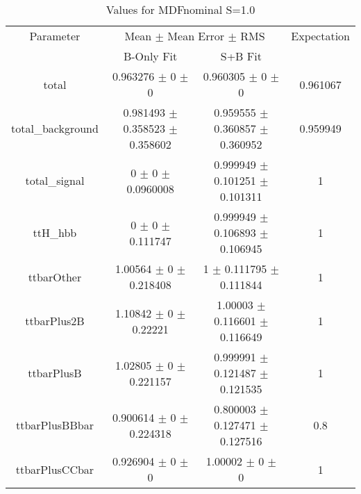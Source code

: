 \begin{table}
\centering
\caption{Values for MDFnominal S=1.0}
\begin{tabular}{cccc}
\toprule
Parameter & \multicolumn{2}{c}{Mean $\pm$ Mean Error $\pm$ RMS} & Expectation\\
 & B-Only Fit & S+B Fit & \\
\midrule
total & \num{0.963276} $\pm$ \num{0} $\pm$ \num{0} & \num{0.960305} $\pm$ \num{0} $\pm$ \num{0} & \num{0.961067}\\
total\_background & \num{0.981493} $\pm$ \num{0.358523} $\pm$ \num{0.358602} & \num{0.959555} $\pm$ \num{0.360857} $\pm$ \num{0.360952} & \num{0.959949}\\
total\_signal & \num{0} $\pm$ \num{0} $\pm$ \num{0.0960008} & \num{0.999949} $\pm$ \num{0.101251} $\pm$ \num{0.101311} & \num{1}\\
ttH\_hbb & \num{0} $\pm$ \num{0} $\pm$ \num{0.111747} & \num{0.999949} $\pm$ \num{0.106893} $\pm$ \num{0.106945} & \num{1}\\
ttbarOther & \num{1.00564} $\pm$ \num{0} $\pm$ \num{0.218408} & \num{1} $\pm$ \num{0.111795} $\pm$ \num{0.111844} & \num{1}\\
ttbarPlus2B & \num{1.10842} $\pm$ \num{0} $\pm$ \num{0.22221} & \num{1.00003} $\pm$ \num{0.116601} $\pm$ \num{0.116649} & \num{1}\\
ttbarPlusB & \num{1.02805} $\pm$ \num{0} $\pm$ \num{0.221157} & \num{0.999991} $\pm$ \num{0.121487} $\pm$ \num{0.121535} & \num{1}\\
ttbarPlusBBbar & \num{0.900614} $\pm$ \num{0} $\pm$ \num{0.224318} & \num{0.800003} $\pm$ \num{0.127471} $\pm$ \num{0.127516} & \num{0.8}\\
ttbarPlusCCbar & \num{0.926904} $\pm$ \num{0} $\pm$ \num{0} & \num{1.00002} $\pm$ \num{0} $\pm$ \num{0} & \num{1}\\
\bottomrule
\end{tabular}
\end{table}